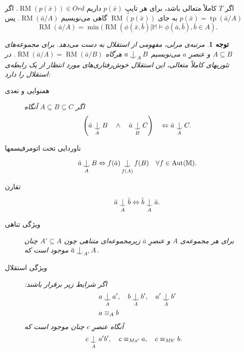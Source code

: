 \documentclass[12pt,a4paper]{report}
\def\Ind#1#2{#1\setbox0=\hbox{$#1x$}\kern\wd0\hbox to 0pt{\hss$#1\mid$\hss}
\lower.9\ht0\hbox to 0pt{\hss$#1\smile$\hss}\kern\wd0}
\def\ind{\mathop{\mathpalette\Ind{}}}
\theoremstyle{colorhead}
\newtheorem{tav}[thm]{توجه}
\DeclareMathOperator{\RM}{RM}
\DeclareMathOperator{\tp}{tp}
\DeclareMathOperator{\Aut}{Aut}
\begin{document}
اگر 
$T$
کاملاً متعالی باشد، برای هر تایپِ
$p(\bar{x})$
داریم
$\RM(p(\bar{x}))\in Ord$.
اگر
$p(\bar{x})=\tp(\bar{a}/A)$
به جای
$\RM(p(\bar{x}))$
گاهی می‌نویسیم 
$\RM(\bar{a}/A)$.
پس
\[\RM(\bar{a}/A)=\min (\RM(\phi(\bar{x},\bar{b})|\mathbb{M}\models
\phi(\bar{a},\bar{b}),\bar{b}\in A).\]
\begin{framed}
\begin{tav}
مرتبه‌ی مرلی، مفهومی از استقلال به دست می‌دهد. برای مجموعه‌های
\mbox{$A\subseteq B$}
و
عنصرِ
$a$
می‌نویسیم
$a\ind_A B$
هرگاه
$\RM(\bar{a}/A)=\RM(\bar{a}/B)$.
در تئوریهای کاملاً متعالی، این استقلال خوش‌رفتاری‌های مورد انتظار از
یک رابطه‌ی استقلال را دارد:
\begin{description}
\item[همنوایی و تعدی]
اگر
$A\subseteq B\subseteq C$
آنگاه
\[
\left(\bar{a}\ind_A B \quad \wedge\quad   \bar{a}\ind_B C\right)\quad \Leftrightarrow
\bar{a}\ind_A C.
\]
\item[ناوردایی تحت اتومرفیسمها]
\[
\bar{a}\ind_A B\Leftrightarrow f(\bar{a})\ind_{f(A)}f(B) \quad \forall f\in \Aut(\mathbb{M}).
\]
\item[تقارن]
\[
\bar{a}\ind_A \bar{b}\Leftrightarrow \bar{b}\ind_A \bar{a}.
\]
\item[ویژگی تناهی]
برای هر مجموعه‌ی
$A$
و عنصرِ
$\bar{a}$
زیرمجموعه‌ای متناهی چون
$A'\subseteq A$
چنان موجود است که 
$\bar{a}\ind_{A'} A$.
\item[ویژگی استقلال]
اگر شرایط زیر برقرار باشند:
\begin{align*}
& a\ind_A a', \quad  b\ind_A b', \quad   a'\ind_A b'\\
& a\equiv_A b
\end{align*}
آنگاه عنصرِ
$c$
چنان موجود است که 
\begin{align*}
& c\ind_A a'b',\quad c\equiv_{Ma'}a, \quad c\equiv_{Mb'}b.
\end{align*}
\end{description}
\end{tav}
\end{framed}
\end{document}
